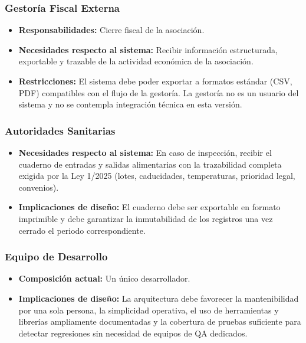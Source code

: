 \subsubsection{Gestoría Fiscal Externa}
\begin{itemize}
    \item \textbf{Responsabilidades:} Cierre fiscal de la asociación.
    
    \item \textbf{Necesidades respecto al sistema:}  Recibir información estructurada,
    exportable y trazable de la actividad económica de la asociación.
    
    \item \textbf{Restricciones:} El sistema debe poder exportar a
    formatos estándar (CSV, PDF) compatibles con el flujo de la gestoría. La
    gestoría no es un usuario del sistema y no se contempla integración
    técnica en esta versión.
\end{itemize}


\subsubsection{Autoridades Sanitarias}
\begin{itemize}
    \item \textbf{Necesidades respecto al sistema:} En caso de inspección, recibir el
    cuaderno de entradas y salidas alimentarias con la trazabilidad completa
    exigida por la Ley 1/2025 (lotes, caducidades, temperaturas, prioridad
    legal, convenios).
    
    \item \textbf{Implicaciones de diseño:} El cuaderno debe ser exportable en formato
    imprimible y debe garantizar la inmutabilidad de los registros una vez
    cerrado el periodo correspondiente.
\end{itemize}


\subsubsection{Equipo de Desarrollo}
\begin{itemize}
    \item \textbf{Composición actual:} Un único desarrollador.
    
    \item \textbf{Implicaciones de diseño:} La arquitectura debe favorecer la
    mantenibilidad por una sola persona, la simplicidad operativa, el uso de
    herramientas y librerías ampliamente documentadas y la cobertura de
    pruebas suficiente para detectar regresiones sin necesidad de equipos de
    QA dedicados.
\end{itemize}


